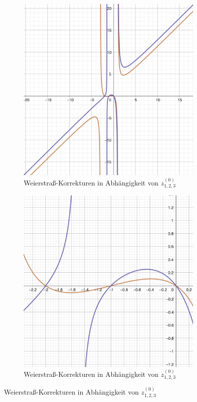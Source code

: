 \documentclass[12pt]{article}
\begin{document}
\begin{figure}[H]
  \centering
  \begin{subfigure}[b]{0.45\textwidth}
    \centering
    \includegraphics[width=\textwidth]{./Weierstrass_Korrekturen_Far.png}
    \caption{Weierstraß-Korrekturen in Abhängigkeit von $z_{1,2,3}^{(0)}$}
  \end{subfigure}
  \hfill
  \begin{subfigure}[b]{0.45\textwidth}
    \centering
    \includegraphics[width=\textwidth]{./Weierstrass_Korrekturen_Close.png}
    \caption{Weierstraß-Korrekturen in Abhängigkeit von $z_{1,2,3}^{(0)}$}
  \end{subfigure}
\end{figure}
\end{document}
